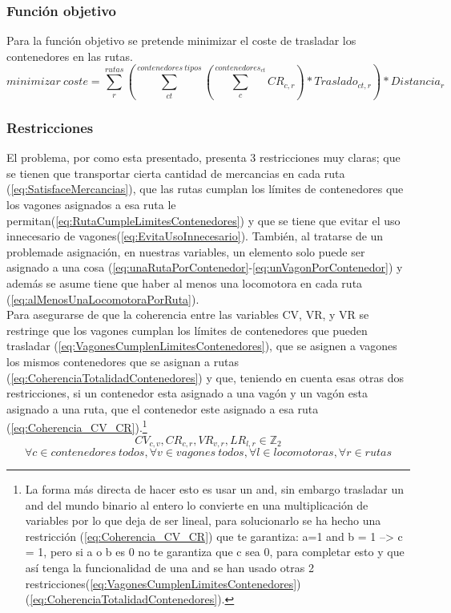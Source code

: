\documentclass[11pt,spanish]{article}
\begin{document}
			\subsubsection{Función objetivo}
			Para la función objetivo se pretende minimizar el coste de trasladar los contenedores en las rutas.
			$$
			minimizar\ coste = \sum_r^{rutas} \left( \sum_{ct}^{contenedores\ tipos} \left( \sum_c^{contenedores_{ct}} CR_{c,r} \right) * Traslado_{ct,r} \right) * Distancia_r
			$$
			\subsubsection{Restricciones}
			El problema, por como esta presentado, presenta 3 restricciones muy claras; que se tienen que transportar cierta cantidad de mercancias en cada ruta (\ref{eq:SatisfaceMercancias}), que las rutas cumplan los límites de contenedores que los vagones asignados a esa ruta le permitan(\ref{eq:RutaCumpleLimitesContenedores}) y que se tiene que evitar el uso innecesario de vagones(\ref{eq:EvitaUsoInnecesario}). También, al tratarse de un problemade asignación, en nuestras variables, un elemento solo puede ser asignado a una cosa (\ref{eq:unaRutaPorContenedor}-\ref{eq:unVagonPorContenedor}) y además se asume tiene que haber al menos una locomotora en cada ruta (\ref{eq:alMenosUnaLocomotoraPorRuta}).\\
			Para asegurarse de que la coherencia entre las variables CV, VR, y VR se restringe que los vagones cumplan los límites de contenedores que pueden trasladar (\ref{eq:VagonesCumplenLimitesContenedores}), que se asignen a vagones los mismos contenedores que se asignan a rutas (\ref{eq:CoherenciaTotalidadContenedores}) y que, teniendo en cuenta esas otras dos restricciones, si un contenedor esta asignado a una vagón y un vagón esta asignado a una ruta, que el contenedor este asignado a esa ruta (\ref{eq:Coherencia_CV_CR}).\footnote{La forma más directa de hacer esto es usar un and, sin embargo trasladar un and del mundo binario al entero lo convierte en una multiplicación de variables por lo que deja de ser lineal, para solucionarlo se ha hecho una restricción (\ref{eq:Coherencia_CV_CR}) que te garantiza: a=1 and b = 1 --> c = 1, pero si a o b es 0 no te garantiza que c sea 0, para completar esto y que así tenga la funcionalidad de una and se han usado otras 2 restricciones(\ref{eq:VagonesCumplenLimitesContenedores})(\ref{eq:CoherenciaTotalidadContenedores}).}
			$$
				CV_{c,v},CR_{c,r},VR_{v,r},LR_{l,r} \in \mathbb{Z}_2
			$$
			\begin{equation}
				\forall c \in contenedores\ todos, \forall v \in vagones\ todos, \forall l \in locomotoras, \forall r \in rutas	
			\end{equation}
\end{document}
